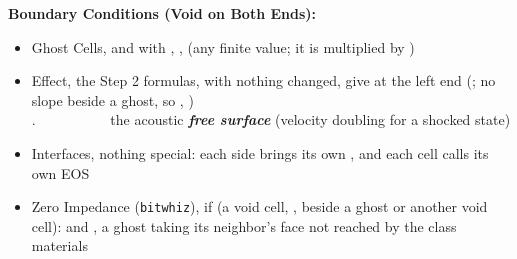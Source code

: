 \documentclass[11pt,addpoints]{exam}
\begin{document}
\begin{tcolorbox}[breakable]
\textbf{Boundary Conditions (Void on Both Ends):}\vspace{.5em}
\begin{itemize}
\item Ghost Cells, \hspace{3mm}  \hspace{2mm} and \hspace{2mm}  \hspace{5mm} with \hspace{2mm} , \hspace{2mm} , \hspace{2mm}  \hspace{2mm} (any finite value; it is multiplied by )\vspace{.5em}
\item Effect, \hspace{3mm} the Step 2 formulas, with nothing changed, give at the left end (; no slope beside a ghost, so , )\vspace{.5em}\\
.~~~~~~~~~~ \hspace{9mm}  \hspace{9mm} the acoustic \textbf{\emph{free surface}} (velocity doubling for a shocked state)\vspace{1em}
\item Interfaces, \hspace{3mm} nothing special: each side brings its own , and each cell calls its own EOS\vspace{.5em}
\item Zero Impedance (\texttt{bitwhiz}), \hspace{3mm} if  (a void cell, , beside a ghost or another void cell): \hspace{2mm}  \hspace{2mm} and \hspace{2mm} , a ghost taking its neighbor's face  \hspace{7mm} not reached by the class materials
\end{itemize}
\end{tcolorbox}

\clearpage
\end{document}
